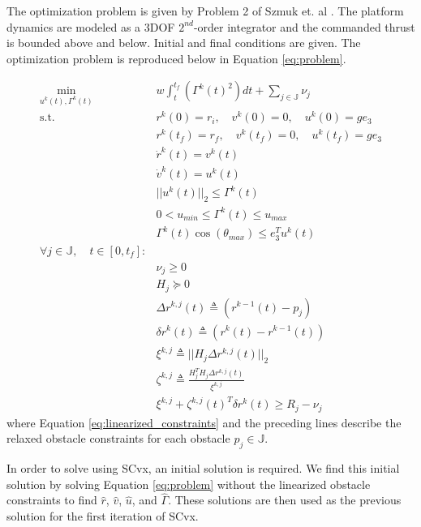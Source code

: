 \documentclass{article}
\begin{document}
The optimization problem is given by Problem 2 of Szmuk et. al \cite{szmuk_convexification_2017}.
The platform dynamics are modeled as a 3DOF $2^{nd}$-order integrator and the commanded thrust is bounded above and below.
Initial and final conditions are given.
The optimization problem is reproduced below in Equation \ref{eq:problem}.

\begin{align} \label{eq:problem}
  \min_{u^k(t), \Gamma^k(t)} \quad & w \int_t^{t_f} (\Gamma^k(t)^2)dt + \sum_{j \in \mathbb{J}} \nu_j \\
  \textrm{s.t.} \quad & r^k(0) = r_i, \quad v^k(0) = 0, \quad u^k(0) = g e_3 \nonumber \\
  & r^k(t_f) = r_f, \quad v^k(t_f) = 0, \quad u^k(t_f) = g e_3 \nonumber \\
  & \dot{r}^k(t) = v^k(t) \nonumber \\
  & \dot{v}^k(t) = u^k(t) \nonumber \\
  & ||u^k(t)||_2 \leq \Gamma^k(t) \nonumber \\
  & 0 < u_{min} \leq \Gamma^k(t) \leq u_{max} \nonumber \\
  & \Gamma^k(t) \cos(\theta_{max}) \leq e_3^T u^k(t) \nonumber \\
  \forall j \in \mathbb{J}, \quad t \in [0, t_f]:& \nonumber \\
  & \nu_j \geq 0 \nonumber \\
  & H_j \succeq 0 \nonumber \\
  & \Delta r^{k, j}(t) \triangleq ( r^{k-1}(t) - p_j ) \nonumber \\
  & \delta r^k(t) \triangleq ( r^k(t) - r^{k-1}(t) ) \nonumber \\
  & \xi^{k,j} \triangleq ||H_j \Delta r^{k,j}(t)||_2 \nonumber \\
  & \zeta^{k,j} \triangleq \frac{H_j^T H_j \Delta r^{k,j}(t)}{\xi^{k,j}} \nonumber \\
  & \xi^{k,j} + \zeta^{k,j}(t)^T \delta r^k(t) \geq R_j - \nu_j \label{eq:linearized_constraints}
\end{align}
where Equation \ref{eq:linearized_constraints} and the preceding lines describe the relaxed obstacle constraints for each obstacle $p_j \in \mathbb{J}$.

In order to solve using SCvx, an initial solution is required.
We find this initial solution by solving Equation \ref{eq:problem} without the linearized obstacle constraints to find $\hat{r}$, $\hat{v}$, $\hat{u}$, and $\hat{\Gamma}$.
These solutions are then used as the previous solution for the first iteration of SCvx.
\end{document}
